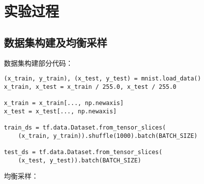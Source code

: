 \documentclass{article}
\begin{document}
\section{实验过程}

\subsection{数据集构建及均衡采样}

数据集构建部分代码：

\begin{lstlisting}
(x_train, y_train), (x_test, y_test) = mnist.load_data()
x_train, x_test = x_train / 255.0, x_test / 255.0

x_train = x_train[..., np.newaxis]
x_test = x_test[..., np.newaxis]

train_ds = tf.data.Dataset.from_tensor_slices(
    (x_train, y_train)).shuffle(1000).batch(BATCH_SIZE)

test_ds = tf.data.Dataset.from_tensor_slices(
    (x_test, y_test)).batch(BATCH_SIZE)
\end{lstlisting}

均衡采样：
\end{document}
